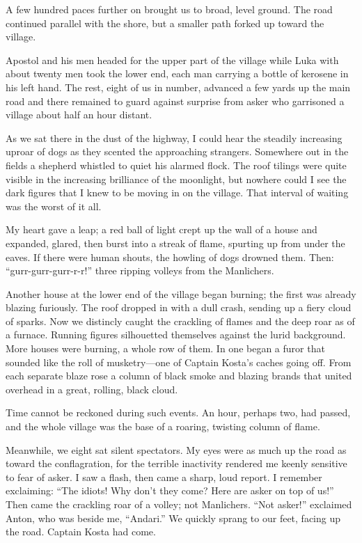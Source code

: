 \documentclass[a5paper,12pt]{book}
\begin{document}
A few hundred paces further on brought us to broad, level ground. The road continued parallel with the shore, but a smaller path forked up toward the village. 

Apostol and his men headed for the upper part of the village while Luka with about twenty men took the lower end, each man carrying a bottle of kerosene in his left hand. The rest, eight of us in number, advanced a few yards up the main road and there remained to guard against surprise from asker who garrisoned a village about half an hour distant. 

As we sat there in the dust of the highway, I could hear the steadily increasing uproar of dogs as they scented the approaching strangers. Somewhere out in the fields a shepherd whistled to quiet his alarmed flock. The roof tilings were quite visible in the increasing brilliance of the moonlight, but nowhere could I see the dark figures that I knew to be moving in on the village. That interval of waiting was the worst of it all. 

My heart gave a leap; a red ball of light crept up the wall of a house and expanded, glared, then burst into a streak of flame, spurting up from under the eaves. If there were human shouts, the howling of dogs drowned them. Then: “gurr-gurr-gurr-r-r!” three ripping volleys from the Manlichers. 

Another house at the lower end of the village began burning; the first was already blazing furiously. The roof dropped in with a dull crash, sending up a fiery cloud of sparks. Now we distincly caught the crackling of flames and the deep roar as of a furnace. Running figures silhouetted themselves against the lurid background. More houses were burning, a whole row of them. In one began a furor that sounded like the roll of musketry—one of Captain Kosta’s caches going off. From each separate blaze rose a column of black smoke and blazing brands that united overhead in a great, rolling, black cloud. 

Time cannot be reckoned during such events. An hour, perhaps two, had passed, and the whole village was the base of a roaring, twisting column of flame.

Meanwhile, we eight sat silent spectators. My eyes were as much up the road as toward the conflagration, for the terrible inactivity rendered me keenly sensitive to fear of asker. I saw a flash, then came a sharp, loud report. I remember exclaiming: “The idiots! Why don’t they come? Here are asker on top of us!” Then came the crackling roar of a volley; not Manlichers. “Not asker!” exclaimed Anton, who was beside me, “Andari.” We quickly sprang to our feet, facing up the road. Captain Kosta had come.
\end{document}
